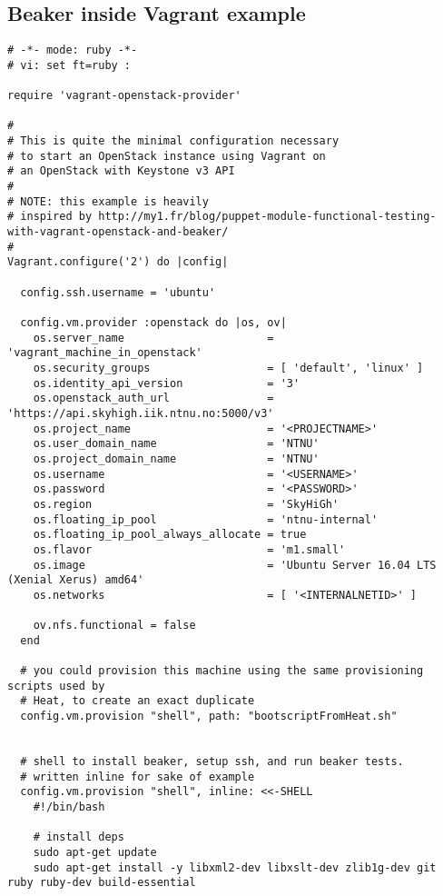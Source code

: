 \subsection{Beaker inside Vagrant example} \label{beakerinsidevagrantexample}

\begin{verbatim}
# -*- mode: ruby -*-
# vi: set ft=ruby :

require 'vagrant-openstack-provider'

#
# This is quite the minimal configuration necessary
# to start an OpenStack instance using Vagrant on
# an OpenStack with Keystone v3 API
#
# NOTE: this example is heavily
# inspired by http://my1.fr/blog/puppet-module-functional-testing-with-vagrant-openstack-and-beaker/
#
Vagrant.configure('2') do |config|

  config.ssh.username = 'ubuntu'

  config.vm.provider :openstack do |os, ov|
    os.server_name                      = 'vagrant_machine_in_openstack'
    os.security_groups                  = [ 'default', 'linux' ]
    os.identity_api_version             = '3'
    os.openstack_auth_url               = 'https://api.skyhigh.iik.ntnu.no:5000/v3'
    os.project_name                     = '<PROJECTNAME>'
    os.user_domain_name                 = 'NTNU'
    os.project_domain_name              = 'NTNU'
    os.username                         = '<USERNAME>'
    os.password                         = '<PASSWORD>'
    os.region                           = 'SkyHiGh'
    os.floating_ip_pool                 = 'ntnu-internal'
    os.floating_ip_pool_always_allocate = true
    os.flavor                           = 'm1.small'
    os.image                            = 'Ubuntu Server 16.04 LTS (Xenial Xerus) amd64'
    os.networks                         = [ '<INTERNALNETID>' ]

    ov.nfs.functional = false
  end

  # you could provision this machine using the same provisioning scripts used by 
  # Heat, to create an exact duplicate
  config.vm.provision "shell", path: "bootscriptFromHeat.sh"
  

  # shell to install beaker, setup ssh, and run beaker tests.
  # written inline for sake of example
  config.vm.provision "shell", inline: <<-SHELL
    #!/bin/bash

    # install deps
    sudo apt-get update
    sudo apt-get install -y libxml2-dev libxslt-dev zlib1g-dev git ruby ruby-dev build-essential


\end{verbatim}

